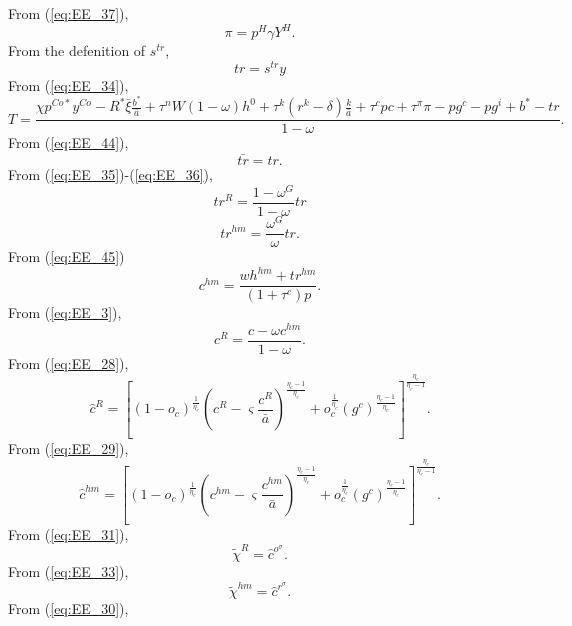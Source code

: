 \documentclass[12pt]{article}
\begin{document}
From (\ref{eq:EE_37}),
\begin{equation*}
\pi = p^H\gamma Y^H.
\end{equation*}
From the defenition of $s^{tr}$,
\begin{equation*}
tr = s^{tr}y
\end{equation*}
From (\ref{eq:EE_34}),
\begin{equation*}
T = \frac{\chi p^{Co*}y^{Co} - R^*\bar{\xi}\frac{b^*}{\bar{a}}  +\tau^n W(1-\omega)h^0 + \tau^k(r^k-\delta)\frac{k}{\bar{a}}+\tau^c pc + \tau^{\pi}\pi - pg^c - pg^i + b^* - tr}{1-\omega}.
\end{equation*}
From (\ref{eq:EE_44}),
\begin{equation*}
 \bar{tr} = tr.   
\end{equation*}
From (\ref{eq:EE_35})-(\ref{eq:EE_36}),
\begin{equation*}
 tr^R = \frac{1-\omega^G}{1-\omega}tr  
\end{equation*}
\begin{equation*}
tr^{hm} = \frac{\omega^G}{\omega}tr.
\end{equation*}
From (\ref{eq:EE_45})
\begin{equation*}
c^{hm} = \frac{wh^{hm} + tr^{hm}}{(1+\tau^c)p}.    
\end{equation*}
From (\ref{eq:EE_3}),
\begin{equation*}
 c^R = \frac{c-\omega c^{hm}}{1-\omega}.   
\end{equation*}
From (\ref{eq:EE_28}),
\begin{equation*}
 \hat{c}^R = \left[(1-o_c)^{\frac{1}{\eta_c}}\left(c^R-\varsigma \frac{c^R}{\bar{a}}\right)^{\frac{\eta_c-1}{\eta_c}}+o_c^{\frac{1}{\eta_c}}\left(g^c\right)^{\frac{\eta_c-1}{\eta_c}}\right]^{\frac{\eta_c}{\eta_c-1}}. 
\end{equation*}
From (\ref{eq:EE_29}),
\begin{equation*}
\hat{c}^{hm} = \left[(1-o_c)^{\frac{1}{\eta_c}}\left(c^{hm}-\varsigma \frac{c^{hm}}{\bar{a}}\right)^{\frac{\eta_c-1}{\eta_c}}+o_c^{\frac{1}{\eta_c}}\left(g^c\right)^{\frac{\eta_c-1}{\eta_c}}\right]^{\frac{\eta_c}{\eta_c-1}}.
\end{equation*}
From (\ref{eq:EE_31}),%
\begin{equation*}
\widetilde{\chi}^R=\hat{c}^{o^\sigma}.
\end{equation*}%
From (\ref{eq:EE_33}),%
\begin{equation*}
\widetilde{\chi}^{hm}=\hat{c}^{r^\sigma}.
\end{equation*}%
From (\ref{eq:EE_30}),%
\end{document}
